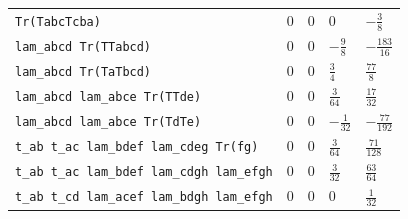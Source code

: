 \begin{center}
\begin{longtable}{lllll}
\texttt{Tr(TabcTcba)} & $0$ & $0$ & $0$ & $- \frac{3}{8}$\\
\texttt{lam\_abcd Tr(TTabcd)} & $0$ & $0$ & $- \frac{9}{8}$ & $- \frac{183}{16}$\\
\texttt{lam\_abcd Tr(TaTbcd)} & $0$ & $0$ & $\frac{3}{4}$ & $\frac{77}{8}$\\
\texttt{lam\_abcd lam\_abce Tr(TTde)} & $0$ & $0$ & $\frac{3}{64}$ & $\frac{17}{32}$\\
\texttt{lam\_abcd lam\_abce Tr(TdTe)} & $0$ & $0$ & $- \frac{1}{32}$ & $- \frac{77}{192}$\\
\texttt{t\_ab t\_ac lam\_bdef lam\_cdeg Tr(fg)} & $0$ & $0$ & $\frac{3}{64}$ & $\frac{71}{128}$\\
\texttt{t\_ab t\_ac lam\_bdef lam\_cdgh lam\_efgh} & $0$ & $0$ & $\frac{3}{32}$ & $\frac{63}{64}$\\
\texttt{t\_ab t\_cd lam\_acef lam\_bdgh lam\_efgh} & $0$ & $0$ & $0$ & $\frac{1}{32}$\\
\bottomrule
\end{longtable}
\end{center}
